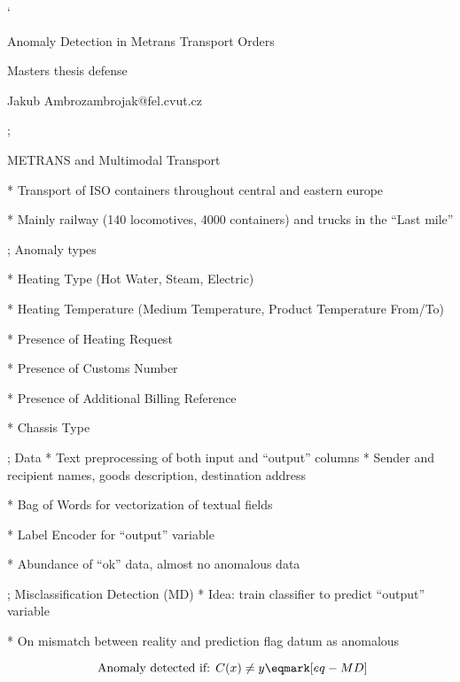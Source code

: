 

\let\s=\relax \let\restore=\relax

\worktype[D/EN]

\activettchar`

\slides

\slideshow 

\tit Anomaly Detection in Metrans Transport Orders

\subtit Masters thesis defense

\bigskip
\subtit\Black Jakub Ambroz\nl ambrojak@fel.cvut.cz


\pg; %

\sec METRANS and Multimodal Transport

* Transport of ISO containers throughout central and eastern europe

* Mainly railway (140 locomotives, 4000 containers) and trucks in the “Last mile”

\pg;
\sec Anomaly types

* Heating Type (Hot Water, Steam, Electric)

* Heating Temperature (Medium Temperature, Product Temperature From/To)

* Presence of Heating Request

* Presence of Customs Number

* Presence of Additional Billing Reference

* Chassis Type

\pg;
\sec Data
* Text preprocessing of both input and “output” columns
\begitems
* Sender and recipient names, goods description, destination address
\enditems

* Bag of Words for vectorization of textual fields

* Label Encoder for “output” variable

* Abundance of “ok” data, almost no anomalous data

\pg;
\sec Misclassification Detection (MD)
* Idea: train classifier to predict “output” variable

* On mismatch between reality and prediction flag datum as anomalous

$$\hbox{ Anomaly detected if:  } C(x) \neq y \eqmark[eq-MD]$$

